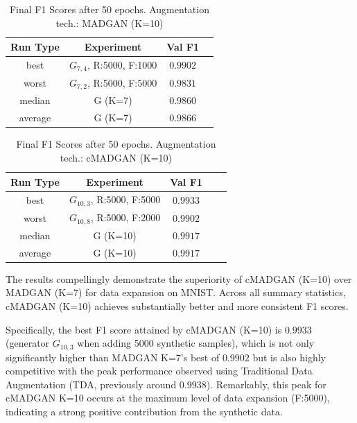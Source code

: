 \begin{table}[H]
	\vspace{-1.5em}
	\centering
	\begin{tabular}{|c|c|c|c|}
		\hline
		Run Type & Experiment & Val F1 \\ \hline
		best & \(G_{7, 4}\), R:5000, F:1000 & $0.9902$\\ \hline
		worst & \(G_{7, 2}\), R:5000, F:5000 & $0.9831$\\ \hline
		median & G (K=7) & $0.9860$\\ \hline
		average & G (K=7) & $0.9866$
		\\ \hline
	\end{tabular}
    \caption{Final F1 Scores after 50 epochs. Augmentation tech.: MADGAN (K=10)}
        \label{tab:res_expansion_mnist_cmadgan_vs_madgan__madgan}
\end{table}
\begin{table}[H]
	\centering
	\vspace{-1.5em}
	\begin{tabular}{|c|c|c|c|c|}
		\hline
		Run Type & Experiment & Val F1 \\ \hline
		best & \(G_{10, 3}\), R:5000, F:5000 & $0.9933$\\ \hline
		worst & \(G_{10, 8}\), R:5000, F:2000 & $0.9902$\\ \hline
		median & G (K=10) & $0.9917$\\ \hline
		average & G (K=10) & $0.9917$
		\\ \hline
	\end{tabular}
    \caption{Final F1 Scores after 50 epochs. Augmentation tech.: cMADGAN (K=10)}
        \label{tab:res_expansion_mnist_cmadgan_vs_madgan__cmadgan}
\end{table}

The results compellingly demonstrate the superiority of cMADGAN (K=10) over MADGAN (K=7) for data expansion on MNIST. Across all summary statistics, cMADGAN (K=10) achieves substantially  better and more consistent F1 scores.

Specifically, the best F1 score attained by cMADGAN (K=10) is $0.9933$ (generator \(G_{10,3}\) when adding 5000 synthetic samples), which is not only significantly higher than MADGAN K=7's best of $0.9902$ but is also highly competitive with the peak performance observed using Traditional Data Augmentation (TDA, previously around $0.9938$). Remarkably, this peak for cMADGAN K=10 occurs at the maximum level of data expansion (F:5000), indicating a strong positive contribution from the synthetic data.

